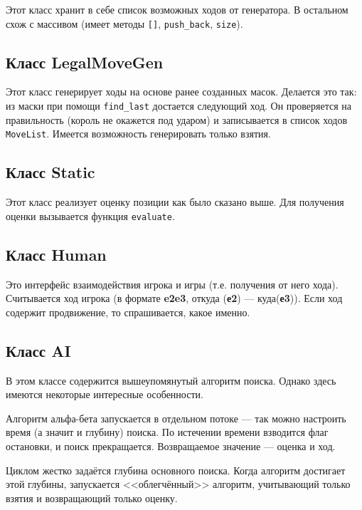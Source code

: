 Этот класс хранит в себе список возможных ходов от генератора. В остальном схож с массивом (имеет методы \texttt{[]}, \texttt{push\_back}, \texttt{size}).

\subsection*{Класс LegalMoveGen}

Этот класс генерирует ходы на основе ранее созданных масок. Делается это так: из маски при помощи \texttt{find\_last} достается следующий ход. Он проверяется на правильность (король не окажется под ударом) и записывается в список ходов \texttt{MoveList}. Имеется возможность генерировать только взятия.

\subsection*{Класс Static}

Этот класс реализует оценку позиции как было сказано выше. Для получения оценки вызывается функция \texttt{evaluate}.

\subsection*{Класс Human}

Это интерфейс взаимодействия игрока и игры (т.е. получения от него хода). Считывается ход игрока (в формате \textbf{e2e3}, откуда (\textbf{е2}) --- куда(\textbf{е3})). Если ход содержит продвижение, то спрашивается, какое именно.

\subsection*{Класс AI}

В этом классе содержится вышеупомянутый алгоритм поиска.  Однако здесь имеются некоторые интересные особенности.

Алгоритм альфа-бета запускается в отдельном потоке --- так можно настроить время (а значит и глубину) поиска. По истечении времени взводится флаг остановки, и поиск прекращается. Возвращаемое значение --- оценка и ход.

Циклом жестко задаётся глубина основного поиска. Когда алгоритм достигает этой глубины, запускается <<облегчённый>> алгоритм, учитывающий только взятия и возвращающий только оценку.